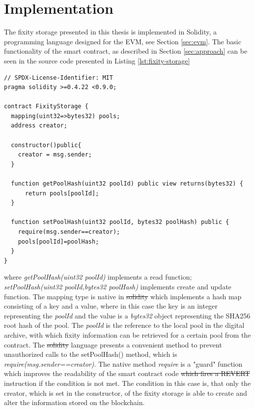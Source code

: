 \documentclass[final]{vutinfth}
\providecommand{\DIFaddtex}[1]{{\protect\color{blue}\uwave{#1}}} %
\providecommand{\DIFdeltex}[1]{{\protect\color{red}\sout{#1}}}                      %
\providecommand{\DIFaddbegin}{} %
\providecommand{\DIFaddend}{} %
\providecommand{\DIFdelbegin}{} %
\providecommand{\DIFdelend}{} %
\providecommand{\DIFadd}[1]{\texorpdfstring{\DIFaddtex{#1}}{#1}} %
\providecommand{\DIFdel}[1]{\texorpdfstring{\DIFdeltex{#1}}{}} %
\begin{document}
\section{Implementation}
\label{sec:implementation}
The fixity storage presented in this thesis is implemented in Solidity, a programming language designed for the EVM, see Section \ref{sec:evm}.
The basic functionality of the smart contract, as described in Section \ref{sec:approach} can be seen in the source code presented in Listing \ref{lst:fixity-storage}
\begin{lstlisting}[language=Solidity,caption={MVP source code of the fixity storage deployed on the Ropsten test network \url{https://Ropsten.etherscan.io/address/0x0243c7aa552730E8C6F7ED25A480a7C0c88a70f0}},label=lst:fixity-storage]
// SPDX-License-Identifier: MIT
pragma solidity >=0.4.22 <0.9.0;

contract FixityStorage {
  mapping(uint32=>bytes32) pools;
  address creator;

  constructor()public{
    creator = msg.sender;
  }

  function getPoolHash(uint32 poolId) public view returns(bytes32) {
      return pools[poolId];
  }

  function setPoolHash(uint32 poolId, bytes32 poolHash) public {
    require(msg.sender==creator);
    pools[poolId]=poolHash;
  }
}
\end{lstlisting}
where \textit{getPoolHash(uint32 poolId)} implements a read function; \textit{setPoolHash(uint32 poolId,bytes32 poolHash)} implements create and update function. The mapping type is native in \DIFdelbegin \DIFdel{solidity }\DIFdelend \DIFaddbegin \DIFadd{Solidity }\DIFaddend which implements a hash map consisting of a key and a value, where in this case the key is an integer representing the \textit{poolId} and the value is a \textit{bytes32} object representing the SHA256 root hash of the pool. The \textit{poolId} is the reference to the local pool in the digital archive, with which fixity information can be retrieved for a certain pool from the contract. The \DIFdelbegin \DIFdel{solidity }\DIFdelend \DIFaddbegin \DIFadd{Solidity }\DIFaddend language presents a convenient  method to prevent unauthorized calls to the setPoolHash() method, which is \textit{require(msg.sender==creator)}. The native method \textit{require} is a "guard" function which improves the readability of the smart contract code \DIFdelbegin \DIFdel{which fires a REVERT }\DIFdelend \DIFaddbegin \DIFadd{and reverts the }\DIFaddend instruction if the condition is not met. The condition in this case is, that only the creator, which is set in the constructor, of the fixity storage is able to create and alter the information stored on the blockchain.
\end{document}
